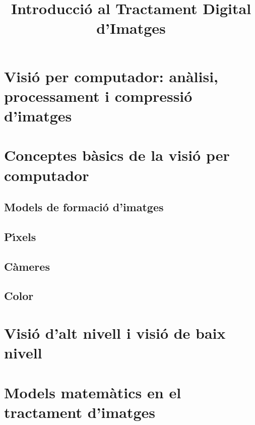 \documentclass{article}
\title{Introducci\'o al Tractament Digital d'Imatges}
\date{}
\begin{document}
\maketitle
\tableofcontents

\section{Visi\'o per computador: an\`alisi, processament i compressi\'o d'imatges}

\section{Conceptes b\`asics de la visi\'o per computador}

\subsection{Models de formaci\'o d'imatges}

\subsection{P\'\i xels}

\subsection{C\`ameres}

\subsection{Color}

\section{Visi\'o d'alt nivell i visi\'o de baix nivell}

\section{Models matem\`atics en el tractament d'imatges}
\end{document}
